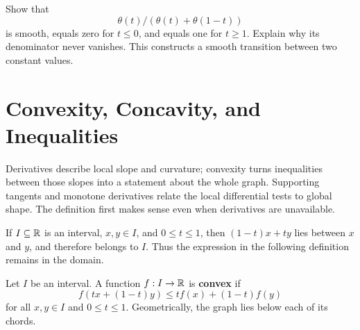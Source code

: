 \begin{exercise}
Show that
\[
\theta(t)/(\theta(t)+\theta(1-t))
\]
 is smooth, equals zero for
$t\leq0$, and equals one for $t\geq1$. Explain why its denominator never
vanishes. This constructs a smooth transition between two constant values.
\end{exercise}

\section{Convexity, Concavity, and Inequalities}

Derivatives describe local slope and curvature; convexity turns inequalities
between those slopes into a statement about the whole graph. Supporting
tangents and monotone derivatives relate the local
differential tests to global shape. The definition first makes sense even
when derivatives are unavailable.

If $I\subseteq\mathbb{R}$ is an interval, $x,y\in I$, and $0\leq t\leq1$, then
$(1-t)x+ty$ lies between $x$ and $y$, and therefore belongs to $I$.
Thus the expression in the following definition remains in the domain.
\begin{definition}
Let $I$ be an interval.  A function $f:I\to\mathbb{R}$ is \textbf{convex} if
\[
f(tx+(1-t)y)\leq tf(x)+(1-t)f(y)
\]
for all $x,y\in I$ and $0\leq t\leq1$.  Geometrically, the graph lies below
each of its chords.
\end{definition}

